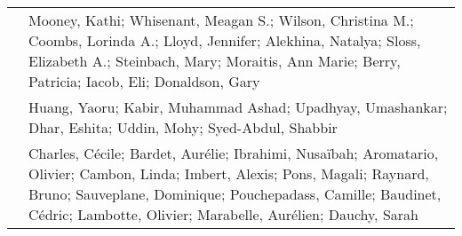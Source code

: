 \documentclass[
]{article}
\begin{document}
\begin{longtable}[]{@{}
  >{\raggedleft\arraybackslash}p{}
  >{\raggedright\arraybackslash}p{}@{}}
27 & Mooney, Kathi; Whisenant, Meagan S.; Wilson, Christina M.; Coombs,
Lorinda A.; Lloyd, Jennifer; Alekhina, Natalya; Sloss, Elizabeth A.;
Steinbach, Mary; Moraitis, Ann Marie; Berry, Patricia; Iacob, Eli;
Donaldson, Gary \\
28 & Huang, Yaoru; Kabir, Muhammad Ashad; Upadhyay, Umashankar; Dhar,
Eshita; Uddin, Mohy; Syed-Abdul, Shabbir \\
29 & Charles, Cécile; Bardet, Aurélie; Ibrahimi, Nusaïbah; Aromatario,
Olivier; Cambon, Linda; Imbert, Alexis; Pons, Magali; Raynard, Bruno;
Sauveplane, Dominique; Pouchepadass, Camille; Baudinet, Cédric;
Lambotte, Olivier; Marabelle, Aurélien; Dauchy, Sarah \\
\end{longtable}
\end{document}
